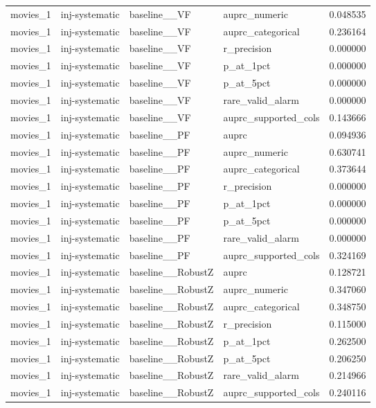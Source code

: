 \begin{tabular}{lllll}
movies\_1 & inj-systematic & baseline\_\_VF & auprc\_numeric & 0.048535 \\
movies\_1 & inj-systematic & baseline\_\_VF & auprc\_categorical & 0.236164 \\
movies\_1 & inj-systematic & baseline\_\_VF & r\_precision & 0.000000 \\
movies\_1 & inj-systematic & baseline\_\_VF & p\_at\_1pct & 0.000000 \\
movies\_1 & inj-systematic & baseline\_\_VF & p\_at\_5pct & 0.000000 \\
movies\_1 & inj-systematic & baseline\_\_VF & rare\_valid\_alarm & 0.000000 \\
movies\_1 & inj-systematic & baseline\_\_VF & auprc\_supported\_cols & 0.143666 \\
movies\_1 & inj-systematic & baseline\_\_PF & auprc & 0.094936 \\
movies\_1 & inj-systematic & baseline\_\_PF & auprc\_numeric & 0.630741 \\
movies\_1 & inj-systematic & baseline\_\_PF & auprc\_categorical & 0.373644 \\
movies\_1 & inj-systematic & baseline\_\_PF & r\_precision & 0.000000 \\
movies\_1 & inj-systematic & baseline\_\_PF & p\_at\_1pct & 0.000000 \\
movies\_1 & inj-systematic & baseline\_\_PF & p\_at\_5pct & 0.000000 \\
movies\_1 & inj-systematic & baseline\_\_PF & rare\_valid\_alarm & 0.000000 \\
movies\_1 & inj-systematic & baseline\_\_PF & auprc\_supported\_cols & 0.324169 \\
movies\_1 & inj-systematic & baseline\_\_RobustZ & auprc & 0.128721 \\
movies\_1 & inj-systematic & baseline\_\_RobustZ & auprc\_numeric & 0.347060 \\
movies\_1 & inj-systematic & baseline\_\_RobustZ & auprc\_categorical & 0.348750 \\
movies\_1 & inj-systematic & baseline\_\_RobustZ & r\_precision & 0.115000 \\
movies\_1 & inj-systematic & baseline\_\_RobustZ & p\_at\_1pct & 0.262500 \\
movies\_1 & inj-systematic & baseline\_\_RobustZ & p\_at\_5pct & 0.206250 \\
movies\_1 & inj-systematic & baseline\_\_RobustZ & rare\_valid\_alarm & 0.214966 \\
movies\_1 & inj-systematic & baseline\_\_RobustZ & auprc\_supported\_cols & 0.240116 \\

\end{tabular}

